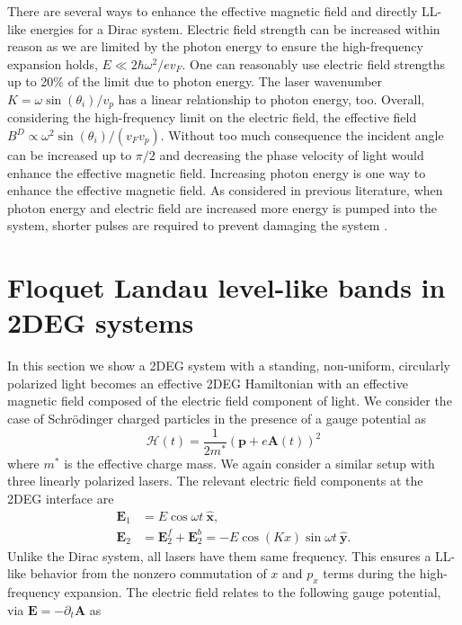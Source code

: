 \documentclass[aps,prb,twocolumn,showpacs,superscriptaddress]{revtex4-2}
\let\oldhat\hat
\renewcommand{\hat}[1]{\oldhat{\mathbf{#1}}}
\renewcommand{\vec}[1]{\mathbf{#1}}
\newcommand{\ham}{\mathcal{H}}
\begin{document}
There are several ways to enhance the effective magnetic field and directly LL-like energies for a Dirac system.
Electric field strength can be increased within reason as we are limited by the photon energy to ensure the high-frequency expansion holds, $E \ll 2\hbar\omega^2/e v_F$.
One can reasonably use electric field strengths up to 20\% of the limit due to photon energy.
The laser wavenumber $K= \omega \sin{(\theta_i)} / v_p$ has a linear relationship to photon energy, too.
Overall, considering the high-frequency limit on the electric field, the effective field $B^D \propto \omega^2 \sin{(\theta_i)} / (v_F v_p)$.
Without too much consequence the incident angle can be increased up to $\pi/2$ and decreasing the phase velocity of light would enhance the effective magnetic field.
Increasing photon energy is one way to enhance the effective magnetic field.
As considered in previous literature, when photon energy and electric field are increased more energy is pumped into the system, shorter pulses are required to prevent damaging the system \cite{YHW, JWM}.

\section{Floquet Landau level-like bands in 2DEG systems}
In this section we show a 2DEG system with a standing, non-uniform, circularly polarized light becomes an effective 2DEG Hamiltonian with an effective magnetic field composed of the electric field component of light.
We consider the case of Schr\"{o}dinger charged particles in the presence of a gauge potential as
\begin{equation}\label{eq:H2deg}
  \ham(t) = \dfrac{1}{2m^*} \left( \vec{p} + e \vec{A}(t)\right)^2
\end{equation}
where $m^*$ is the effective charge mass.
We again consider a similar setup with three linearly polarized lasers.
The relevant electric field components at the 2DEG interface are
\begin{align} \label{eq:E2field}
  \vec{E}_{1} &= E \cos{\omega t}\ \hat{x}, \nonumber \\
  \vec{E}_{2} &= \vec{E}_2^f + \vec{E}_2^b = -E\cos{(K x)} \sin{\omega t}\ \hat{y}.
\end{align}%
Unlike the Dirac system, all lasers have them same frequency.
This ensures a LL-like behavior from the nonzero commutation of $x$ and $p_x$ terms during the high-frequency expansion.
The electric field relates to the following gauge potential, via $\vec{E} = -\partial_t \vec{A}$ as
\end{document}
